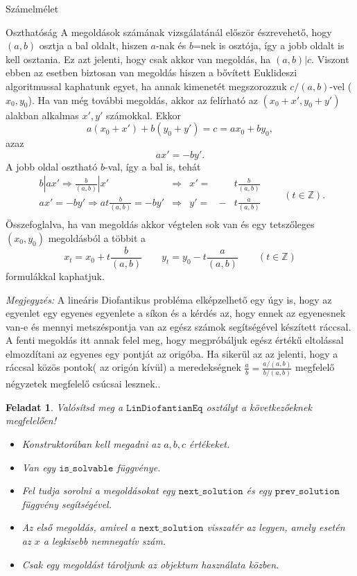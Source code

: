 \documentclass{amsbook}
\theoremstyle{mystyle}
\newtheorem{exercise}{Feladat}[part]
\begin{document}
\begin{part}{Számelmélet}
\begin{section}{Oszthatóság}
  A megoldások számának vizsgálatánál először észrevehet\H o, hogy $(a,b)$
  osztja a bal oldalt, hiszen $a$-nak és $b$=nek is osztója, így a jobb oldalt
  is kell osztania. Ez azt jelenti, hogy csak akkor van megoldás, ha $(a,b)|c$.
  Viszont ebben az esetben biztosan van megoldás hiszen a b\H ovített
  Euklideszi algoritmussal kaphatunk  egyet, ha annak kimenetét megszorozzuk
  $c/(a,b)$-vel ($x_0, y_0$). Ha van még további megoldás, akkor az felírható
  az $(x_0 + x', y_0 + y')$ alakban alkalmas $x',y'$ számokkal. Ekkor \[
    a(x_0+x')+b(y_0+y') = c = ax_0 + by_0,\] azaz \[ ax' = -by'. \]
  A jobb oldal osztható $b$-val, így a bal is, tehát \[
    \begin{array}{lclrl}
      \displaystyle b|ax' \Rightarrow \frac{b}{(a,b)}|x' & \Rightarrow &  
      x'= & &  \displaystyle t\frac{b}{(a,b)} \\
      \displaystyle ax' = -by' \Rightarrow at\frac{b}{(a,b)} = -by' & \Rightarrow &
      y'= & - & \displaystyle t\frac{a}{(a,b)}\\
    \end{array}\qquad (t\in\mathbb{Z}).\]
  Összefoglalva, ha van megoldás akkor végtelen sok van és egy tetsz\H oleges
  $(x_0, y_0)$ megoldásból a többit a 
  \[
    x_t = x_0 + t\frac{b}{(a,b)}\qquad y_t= y_0-t\frac{a}{(a,b)}\qquad(t\in\mathbb{Z})\]
  formulákkal kaphatjuk.

  \emph{Megjegyzés:} A lineáris Diofantikus probléma elképzelhet\H o egy úgy
  is, hogy az egyenlet egy egyenes egyenlete a síkon és a kérdés az, hogy
  ennek az egyenesnek van-e és mennyi metszéspontja van az egész számok segítségével
  készített ráccsal. A fenti megoldás itt annak felel meg, hogy megpróbáljuk 
  egész érték\H u eltolással elmozdítani az egyenes egy pontját az origóba. Ha
  sikerül az az jelenti, hogy a ráccsal közös pontok( az origón kívül) a
  meredekségnek $\frac{a}{b}=\frac{a/(a,b)}{b/(a,b)}$ megfelel\H o négyzetek 
  megfelel\H o csúcsai lesznek..

  \begin{exercise} Valósítsd meg a $\mathtt{LinDiofantianEq}$ osztályt a
    következőeknek megfelelően!
    \begin{itemize}
      \item Konstruktorában kell megadni az $a,b,c$ értékeket.
      \item Van egy $\mathtt{is\_solvable}$ függvénye.
      \item Fel tudja sorolni a megoldásokat egy $\mathtt{next\_solution}$ és
        egy $\mathtt{prev\_solution}$ függvény segítségével.
      \item Az első megoldás, amivel a $\mathtt{next\_solution}$ visszatér az
        legyen, amely esetén az $x$ a legkisebb nemnegatív szám.
      \item Csak egy megoldást tároljunk az objektum használata közben.
    \end{itemize}
  \end{exercise}


\end{section}
\end{part}
\end{document}
